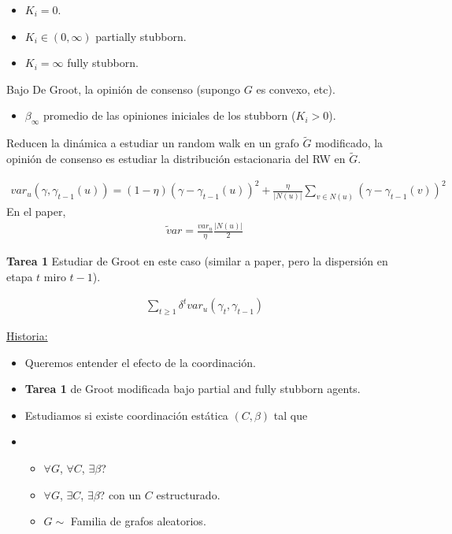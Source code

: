 \documentclass{article}
\begin{document}
\begin{itemize}
	\item $K_i=0$.
	\item $K_i\in (0, \infty)$ partially stubborn.
	\item $K_i=\infty$ fully stubborn.
\end{itemize}	
	
	Bajo De Groot, la opinión de consenso (supongo $G$ es convexo, etc).
	
	\begin{itemize}
		\item $\beta_\infty$ promedio de las opiniones iniciales de los stubborn ($K_i>0$).
	\end{itemize}
	
	Reducen la dinámica a estudiar un random walk en un grafo $\tilde G$ modificado, la opinión de consenso es estudiar la distribución estacionaria del RW en $\tilde G$.
	
	\begin{align*}
		var_u (\gamma, \gamma_{t-1}(u))=(1-\eta) (\gamma-\gamma_{t-1}(u))^2+\frac{\eta}{|N(u)|}\sum_{v \in N(u)} (\gamma-\gamma_{t-1}(v))^2
	\end{align*}
	En el paper,
	\begin{align*}
		\tilde var = \frac{var_u}{\eta} \frac{|N(u)|}{2}
	\end{align*}
	
\textbf{Tarea 1} Estudiar de Groot en este caso (similar a paper, pero la dispersión en etapa $t$ miro $t-1$).

\begin{align*}
	\sum_{t\geq 1} \delta^t var_u(\gamma_t,\gamma_{t-1})
\end{align*}

\underline{Historia:}
\begin{itemize}
	\item Queremos entender el efecto de la coordinación.
	\item \textbf{Tarea 1} de Groot modificada bajo partial and fully stubborn agents.
	\item Estudiamos si existe coordinación estática $(C,\beta)$ tal que
	\item 
	
	
	
	
	\begin{itemize}
	\item $\forall G$, $\forall C$, $\exists \beta$?
	\item $\forall G$, $\exists C$, $\exists \beta$? con un $C$ estructurado.
	\item $G \sim$ Familia de grafos aleatorios.

	
	\end{itemize}
	
\end{itemize}	
\end{document}
